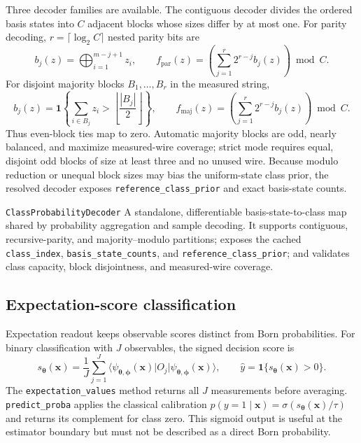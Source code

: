 \documentclass[10pt]{article}
\newcommand{\code}[1]{\texttt{#1}}
\begin{document}
Three decoder families are available.  The contiguous decoder divides the
ordered basis states into $C$ adjacent blocks whose sizes differ by at most
one.  For parity decoding, $r=\lceil\log_2 C\rceil$ nested parity bits are
\begin{equation}
  b_j(z)=\bigoplus_{i=1}^{m-j+1}z_i,
  \qquad
  f_{\mathrm{par}}(z)
  =\left(\sum_{j=1}^{r}2^{r-j}b_j(z)\right)\bmod C.
  \label{eq:classifier-parity-decoder}
\end{equation}
For disjoint majority blocks $B_1,\ldots,B_r$ in the measured string,
\begin{equation}
  b_j(z)=\mathbf 1\!\left\{
    \sum_{i\in B_j}z_i>\left\lfloor\frac{|B_j|}{2}\right\rfloor
  \right\},
  \qquad
  f_{\mathrm{maj}}(z)
  =\left(\sum_{j=1}^{r}2^{r-j}b_j(z)\right)\bmod C.
  \label{eq:classifier-majority-decoder}
\end{equation}
Thus even-block ties map to zero.  Automatic majority blocks are odd, nearly
balanced, and maximize measured-wire coverage; strict mode requires equal,
disjoint odd blocks of size at least three and no unused wire.  Because modulo
reduction or unequal block sizes may bias the uniform-state class prior, the
resolved decoder exposes \code{reference\_class\_prior} and exact basis-state
counts.

\begin{qaspfeature}{\code{ClassProbabilityDecoder}}
A standalone, differentiable basis-state-to-class map shared by probability
aggregation and sample decoding.  It supports contiguous, recursive-parity,
and majority--modulo partitions; exposes the cached \code{class\_index},
\code{basis\_state\_counts}, and \code{reference\_class\_prior}; and validates
class capacity, block disjointness, and measured-wire coverage.
\end{qaspfeature}

\subsection{Expectation-score classification}
\label{sec:classifier-expectation}

Expectation readout keeps observable scores distinct from Born probabilities.
For binary classification with $J$ observables, the signed decision score is
\begin{equation}
  s_{\bm\theta}(\bm x)
  =\frac{1}{J}\sum_{j=1}^{J}
    \langle\psi_{\bm\theta,\bm\phi}(\bm x)\rvert
      O_j
    \lvert\psi_{\bm\theta,\bm\phi}(\bm x)\rangle,
  \qquad \widehat y=\mathbf 1\{s_{\bm\theta}(\bm x)>0\}.
  \label{eq:classifier-binary-score}
\end{equation}
The \code{expectation\_values} method returns all $J$ measurements before
averaging.  \code{predict\_proba} applies the classical calibration
$p(y=1\mid\bm x)=\sigma(s_{\bm\theta}(\bm x)/\tau)$ and returns its complement
for class zero.  This sigmoid output is useful at the estimator boundary but
must not be described as a direct Born probability.
\end{document}
